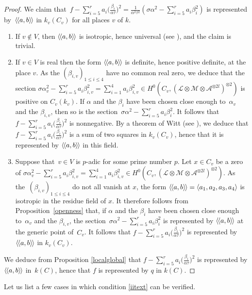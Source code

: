 \documentclass{amsart}
\theoremstyle{definition}
\theoremstyle{remark}
\numberwithin{equation}{section}
\newcommand{\llangle}{\langle\kern-.1em\langle}
\newcommand{\rrangle}{\rangle\kern-.1em\rangle}
\def\cA{\mathcal{A}}
\def\cM{\mathcal{M}}
\def\cL{\mathcal{L}}
\def\cM{\mathcal{M}}
\begin{document}
\begin{proof}
We claim that~$f-\sum_{i=5}^ra_i\big(\frac{\beta_i}{\alpha\tau}\big)^2=\frac{1}{\alpha^2\tau^2}(\sigma\alpha^2-\sum_{i=5}^ra_i\beta_i^2)$ is represented by~$\llangle a,b\rrangle$ in $k_v(C_v)$ for all places $v$ of $k$. 
\begin{enumerate}
[label=(\alph*)] 
\item
If $v\notin V$, then $\llangle a,b\rrangle$ is isotropic, hence universal (see \cite[I.3.4]{Lam}), and the claim is trivial.
\item
 If $v\in V$ is real then the form $\llangle a,b\rrangle$ is definite, hence positive definite, at the place $v$. As the $(\beta_{i,v})_{1\leq i\leq 4}$ have no common real zero, we deduce that the section $\sigma\alpha_v^2-\sum_{i=5}^ra_i\beta_{i,v}^2=\sum_{i=1}^4a_i\beta_{i,v}^2\in H^0(C_v,(\cL\otimes\cM\otimes\cA^{\otimes 2l})^{\otimes 2})$ is positive on $C_v(k_v)$. If $\alpha$ and the $\beta_i$ have been chosen close enough to~$\alpha_v$ and the $\beta_{i,v}$, then so is the section~$\sigma\alpha^2-\sum_{i=5}^ra_i\beta_{i}^2$. It follows that~$f-\sum_{i=5}^ra_i\big(\frac{\beta_i}{\alpha\tau}\big)^2$ is nonnegative.
By a theorem of Witt (see \cite[I~p.\,4]{Witt}), we deduce that $f-\sum_{i=5}^ra_i\big(\frac{\beta_i}{\alpha\tau}\big)^2$ is a sum of two squares in $k_v(C_v)$, hence that it is represented by $\llangle a,b\rrangle$ in this field.
\item
Suppose that~$v\in V$ is $p$-adic for some prime number $p$. Let $x\in C_v$ be a zero of $\sigma\alpha_v^2-\sum_{i=5}^ra_i\beta_{i,v}^2=\sum_{i=1}^4a_i\beta_{i,v}^2\in H^0(C_v,(\cL\otimes\cM\otimes\cA^{\otimes 2l})^{\otimes 2})$. As the~$(\beta_{i,v})_{1\leq i\leq 4}$ do not all vanish at $x$, the form $\llangle a,b\rrangle=\langle a_1,a_2,a_3,a_4\rangle$ is isotropic in the residue field of $x$. It therefore follows from Proposition~\ref{openness} that, if $\alpha$ and the $\beta_i$ have been chosen close enough to~$\alpha_v$ and the $\beta_{i,v}$, the section~$\sigma\alpha^2-\sum_{i=5}^ra_i\beta_{i}^2$ is represented by $\llangle a,b\rrangle$ at the generic point of~$C_v$. It follows that $f-\sum_{i=5}^ra_i\big(\frac{\beta_i}{\alpha\tau}\big)^2$ is represented by $\llangle a,b\rrangle$ in $k_v(C_v)$.
\end{enumerate}
We deduce from Proposition \ref{localglobal} that $f-\sum_{i=5}^ra_i\big(\frac{\beta_i}{\alpha\tau}\big)^2$ is represented by $\llangle a,b\rrangle$ in~$k(C)$, hence that $f$ is represented by $q$ in $k(C)$.
 \end{proof}
 
 Let us list a few cases in which condition \ref{iitext} can be verified.
 
\end{document}
